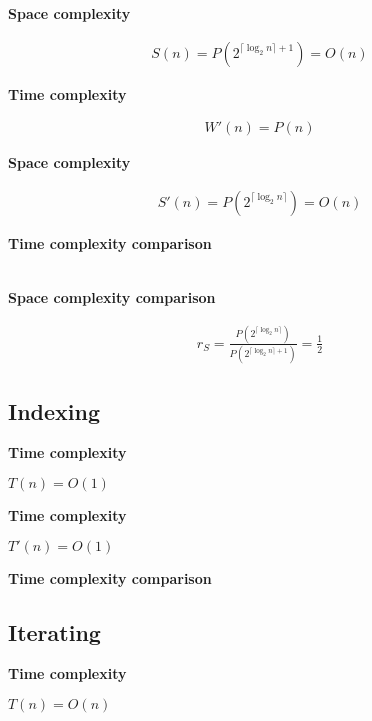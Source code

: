 \documentclass{article}
\newcommand{\tcomplex}{\textbf{Time complexity}}
\newcommand{\scomplex}{\textbf{Space complexity}}
\newcommand{\tcomplexcmp}{\textbf{Time complexity comparison}}
\newcommand{\scomplexcmp}{\textbf{Space complexity comparison}}
\newcommand{\timefn}{T}
\newcommand{\spacefn}{S}
\newcommand{\nwritesfn}{W}
\newcommand{\timenewfn}{\timefn'}
\newcommand{\spacenewfn}{\spacefn'}
\newcommand{\nwritesnewfn}{\nwritesfn'}
\newcommand{\spaceratio}{r_\spacefn}
\newcommand{\bigo}{O}
\newcommand{\biggo}{P}
\newcommand{\varnitems}{n}
\begin{document}
	\scomplex
	
	\begin{align*}
	\spacefn(\varnitems) = \biggo(2^{\lceil \log_2 \varnitems \rceil + 1}) = \bigo(\varnitems)
	\end{align*}
	
	
	\tcomplex
	
	\begin{align*}
	\nwritesnewfn(\varnitems) = \biggo(\varnitems)
	\end{align*}
	
	\scomplex
	
	\begin{align*}
	\spacenewfn(\varnitems) = \biggo(2^{\lceil \log_2 \varnitems \rceil}) = \bigo(\varnitems)
	\end{align*}
	
	\tcomplexcmp
	
	\begin{align*}
	\end{align*}
	
	\scomplexcmp
	
	\begin{align*}
	\spaceratio = \frac {\biggo(2^{\lceil \log_2 \varnitems \rceil})} {\biggo(2^{\lceil \log_2 \varnitems \rceil + 1})} = \frac{1}{2}
	\end{align*}
	
	\subsection{Indexing}
	
	
	\tcomplex
	
	$\timefn(\varnitems) = \bigo(1)$
	
	
	\tcomplex
	
	$\timenewfn(\varnitems) = \bigo(1)$
	
	\tcomplexcmp
	
	\subsection{Iterating}
	
	
	\tcomplex
	
	$\timefn(\varnitems) = \bigo(\varnitems)$
	
	
\end{document}
